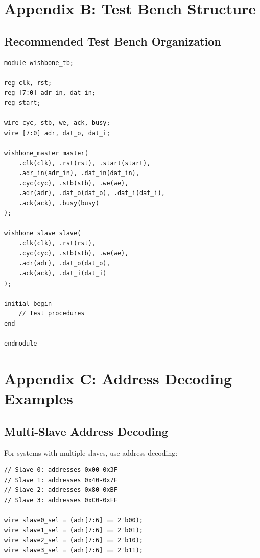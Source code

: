 \documentclass[12pt,a4paper]{article}
\begin{document}
\section{Appendix B: Test Bench Structure}

\subsection{Recommended Test Bench Organization}

\begin{lstlisting}[caption=Testbench Framework]
module wishbone_tb;

reg clk, rst;
reg [7:0] adr_in, dat_in;
reg start;

wire cyc, stb, we, ack, busy;
wire [7:0] adr, dat_o, dat_i;

wishbone_master master(
    .clk(clk), .rst(rst), .start(start),
    .adr_in(adr_in), .dat_in(dat_in),
    .cyc(cyc), .stb(stb), .we(we),
    .adr(adr), .dat_o(dat_o), .dat_i(dat_i),
    .ack(ack), .busy(busy)
);

wishbone_slave slave(
    .clk(clk), .rst(rst),
    .cyc(cyc), .stb(stb), .we(we),
    .adr(adr), .dat_o(dat_o),
    .ack(ack), .dat_i(dat_i)
);

initial begin
    // Test procedures
end

endmodule
\end{lstlisting}

\section{Appendix C: Address Decoding Examples}

\subsection{Multi-Slave Address Decoding}

For systems with multiple slaves, use address decoding:

\begin{lstlisting}[caption=Address Decoder Example]
// Slave 0: addresses 0x00-0x3F
// Slave 1: addresses 0x40-0x7F
// Slave 2: addresses 0x80-0xBF
// Slave 3: addresses 0xC0-0xFF

wire slave0_sel = (adr[7:6] == 2'b00);
wire slave1_sel = (adr[7:6] == 2'b01);
wire slave2_sel = (adr[7:6] == 2'b10);
wire slave3_sel = (adr[7:6] == 2'b11);
\end{lstlisting}
\end{document}
